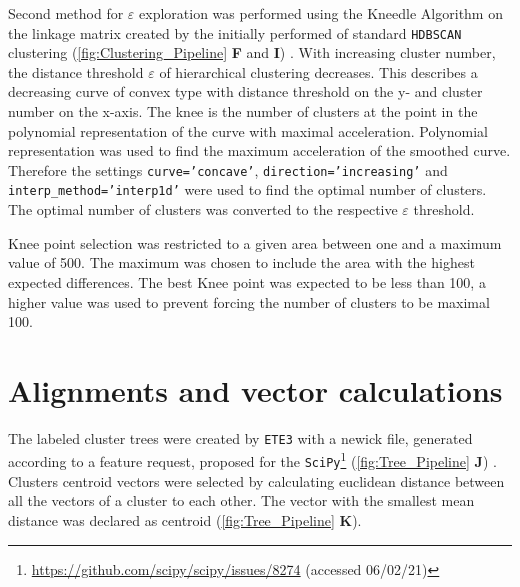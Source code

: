 \vspace{1em}

Second method for $\varepsilon$ exploration was performed using the Kneedle Algorithm on the linkage matrix created by the initially performed of standard \texttt{HDBSCAN} clustering (\autoref{fig:Clustering_Pipeline} \textsf{\textbf{F}} and \textsf{\textbf{I}}) \autocite{satopaa_finding_2011}. With increasing cluster number, the distance threshold $\varepsilon$ of hierarchical clustering decreases. This describes a decreasing curve of convex type with distance threshold on the y- and cluster number on the x-axis. The knee is the number of clusters at the point in the polynomial representation of the curve with maximal acceleration. Polynomial representation was used to find the maximum acceleration of the smoothed curve. Therefore the settings \texttt{curve='concave'}, \texttt{direction='increasing'} and \texttt{interp\_method='interp1d'} were used to find the optimal number of clusters. The optimal number of clusters was converted to the respective $\varepsilon$ threshold.

\vspace{1em}

Knee point selection was restricted to a given area between one and a maximum value of 500. The maximum was chosen to include the area with the highest expected differences. The best Knee point was expected to be less than 100, a higher value was used to prevent forcing the number of clusters to be maximal 100. 

\section{Alignments and vector calculations} \label{sec:MAFFT}

The labeled cluster trees were created by \texttt{ETE3} with a newick file, generated according to a feature request, proposed for the \texttt{SciPy}\footnote{\url{https://github.com/scipy/scipy/issues/8274} (accessed 06/02/21)} (\autoref{fig:Tree_Pipeline} \textsf{\textbf{J}}) \autocite{huerta-cepas_ete_2016}. Clusters centroid vectors were selected by calculating euclidean distance between all the vectors of a cluster to each other. The vector with the smallest mean distance was declared as centroid (\autoref{fig:Tree_Pipeline} \textsf{\textbf{K}}). 


